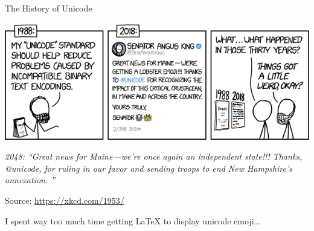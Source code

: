
\begin{frame}[t,plain]
\titlepage
\end{frame}


\begin{frame}{The History of Unicode}
%
\begin{center}
\includegraphics[width=.7\linewidth]{./gfx/xkcd-unicode-history}

\emph{2048: \enquote{Great news for Maine—we're once again an independent state!!! Thanks, @unicode, for ruling in our favor and sending troops to end New Hampshire's annexation. 
}}

\vspace{6pt}
Source: \url{https://xkcd.com/1953/}

\vspace{6pt}
I spent way too much time getting LaTeX to display unicode emoji...
\end{center}
%
\end{frame}


